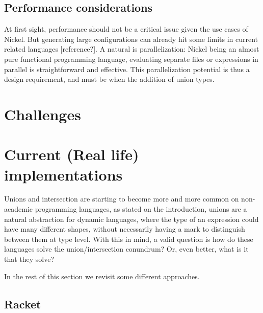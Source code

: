 \documentclass[sigplan,10pt,review,anonymous]{acmart}
\newcommand{\unsure}[2][1=]{}
\newcommand{\info}[2][1=]{}
\begin{document}
\unsure{Something that we must mention somewhere: if we want to check
  that something is a list of As lazily (to avoid making functions
  like hd be O(n), for instance), then we have a lot of the problems of
  higher-order contracts anyway.}

\subsection{Performance considerations}
\info{This a draft}

At first sight, performance should not be a critical issue given the use cases
of Nickel. But generating large configurations can already hit some limits in
current related languages [reference?]. A natural is parallelization:
Nickel being an almost pure functional programming language, evaluating separate
files or expressions in parallel is straightforward and effective. This
parallelization potential is thus a design requirement, and must be when the
addition of union types.

\section{Challenges}


\section{Current (Real life) implementations}

\info{The goal of this section is to outline existing languages that implement
union and intersection, in some form, and shortly compare these
with the semantics tried to obtain on research (WMW, KT)}

Unions and intersection are starting to become more and more common
on non-academic programming languages, as stated on the introduction,
unions are a natural abstraction for dynamic languages, where the type
of an expression could have many different shapes, without necessarily
having a mark to distinguish between them at type level.
With this in mind, a valid question is how do these languages solve the
union/intersection conundrum? Or, even better, what is it that they
solve?

In the rest of this section we revisit some different approaches.

\subsection{Racket}
\end{document}
